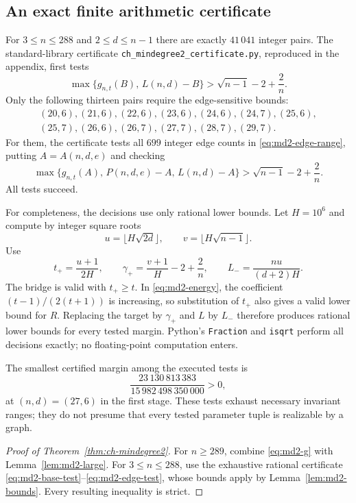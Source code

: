 \documentclass[11pt,a4paper]{article}
\theoremstyle{remark}\newtheorem{remark}[theorem]{Remark}
\begin{document}
\subsection{An exact finite arithmetic certificate}

For $3\le n\le288$ and $2\le d\le n-1$ there are exactly $41\,041$
integer pairs. The standard-library certificate
\texttt{ch\_mindegree2\_certificate.py}, reproduced in the appendix,
first tests
\begin{equation}\label{eq:md2-base-test}
 \max\{g_{n,t}(B),\,L(n,d)-B\}
 >\sqrt{n-1}-2+\frac2n.
\end{equation}
Only the following thirteen pairs require the edge-sensitive bounds:
\[
 \begin{gathered}
 (20,6),(21,6),(22,6),(23,6),(24,6),(24,7),(25,6),\\
 (25,7),(26,6),(26,7),(27,7),(28,7),(29,7).
 \end{gathered}
\]
For them, the certificate tests all $699$ integer edge counts in
\eqref{eq:md2-edge-range}, putting $A=A(n,d,e)$ and checking
\begin{equation}\label{eq:md2-edge-test}
 \max\{g_{n,t}(A),\,P(n,d,e)-A,\,L(n,d)-A\}
 >\sqrt{n-1}-2+\frac2n.
\end{equation}
All tests succeed.

For completeness, the decisions use only rational lower bounds.
Let $H=10^6$ and compute by integer square roots
\[
 u=\lfloor H\sqrt{2d}\rfloor,\qquad
 v=\lfloor H\sqrt{n-1}\rfloor.
\]
Use
\[
 t_+=\frac{u+1}{2H},\qquad
 \gamma_+=\frac{v+1}{H}-2+\frac2n,\qquad
 L_-=\frac{nu}{(d+2)H}.
\]
The bridge is valid with $t_+\ge t$. In \eqref{eq:md2-energy},
the coefficient $(t-1)/(2(t+1))$ is increasing, so substitution of
$t_+$ also gives a valid lower bound for $R$. Replacing the target by
$\gamma_+$ and $L$ by $L_-$ therefore produces rational lower bounds
for every tested margin. Python's \texttt{Fraction} and \texttt{isqrt}
perform all decisions exactly; no floating-point computation enters.

The smallest certified margin among the executed tests is
\[
 \frac{23\,130\,813\,383}{15\,982\,498\,350\,000}>0,
\]
at $(n,d)=(27,6)$ in the first stage.
These tests exhaust necessary invariant ranges; they do not presume
that every tested parameter tuple is realizable by a graph.

\begin{proof}[Proof of Theorem~\ref{thm:ch-mindegree2}]
For $n\ge289$, combine \eqref{eq:md2-g} with
Lemma~\ref{lem:md2-large}. For $3\le n\le288$, use the exhaustive
rational certificate \eqref{eq:md2-base-test}--\eqref{eq:md2-edge-test},
whose bounds apply by Lemma~\ref{lem:md2-bounds}. Every resulting
inequality is strict.
\end{proof}
\end{document}
